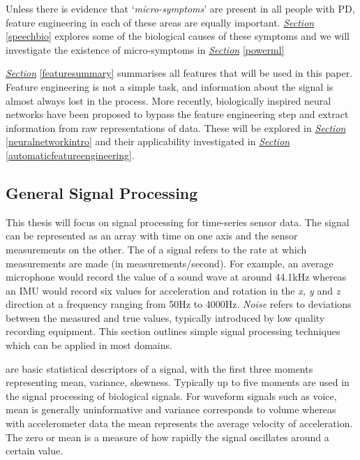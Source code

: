 \documentclass[12pt, twoside]{book}
\renewcommand\emph[1]{\textit{\color{USred}{#1}}}
\begin{document}
Unless there is evidence that `\textit{micro-symptoms}' are present in all people with PD, feature engineering in each of these areas are equally important. \textit{\hyperref[speechbio]{Section}} \ref{speechbio} explores some of the biological causes of these symptoms and we will investigate the existence of  micro-symptoms in \textit{\hyperref[powerml]{Section}} \ref{powerml}


\textit{\hyperref[featuresummary]{Section}} \ref{featuresummary} summarises all features that will be used in this paper. Feature engineering is not a simple task, and information about the signal is almost always lost in the process. More recently, biologically inspired neural networks have been proposed to bypass the feature engineering step and extract information from raw representations of data. These will be explored in \textit{\hyperref[neuralnetworkintro]{Section}} \ref{neuralnetworkintro} and their applicability investigated in \textit{\hyperref[automaticfeatureengineering]{Section}} \ref{automaticfeatureengineering}.

\subsection{General Signal Processing}
\label{generalsignalproc}
This thesis will focus on signal processing for time-series sensor data. The signal can be represented as an array with time on one axis and the sensor measurements on the other. The \emph{frequency} of a signal refers to the rate at which measurements are made (in measurements/second). For example, an average microphone would record the value of a sound wave at around 44.1kHz whereas an IMU would record six values for acceleration and rotation in the \textit{x, y} and \textit{z} direction at a frequency ranging from 50Hz to 4000Hz. \textit{Noise} refers to deviations between the measured and true values, typically introduced by low quality recording equipment. This section outlines simple signal processing techniques which can be applied in most domains.


\emph{Moments} are basic statistical descriptors of a signal, with the first three moments representing mean, variance, skewness. Typically up to five moments are used in the signal processing of biological signals. For waveform signals such as voice, mean is generally uninformative and variance corresponds to volume whereas with accelerometer data the mean represents the average velocity of acceleration.  The zero or mean \emph{crossing rate} is a measure of how rapidly the signal oscillates around a certain value.
\end{document}
